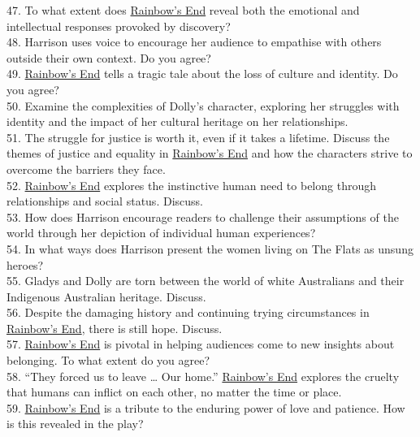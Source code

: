 \documentclass[a4paper]{article}
\begin{document}
47. To what extent does \underline{Rainbow’s End} reveal both the emotional and intellectual responses provoked by discovery?\\

48. Harrison uses voice to encourage her audience to empathise with others outside their own context. Do you agree?\\

49. \underline{Rainbow’s End} tells a tragic tale about the loss of culture and identity. Do you agree?\\

50. Examine the complexities of Dolly’s character, exploring her struggles with identity and the impact of her cultural heritage on her relationships.\\

51. The struggle for justice is worth it, even if it takes a lifetime. Discuss the themes of justice and equality in \underline{Rainbow’s End} and how the characters strive to overcome the barriers they face.\\

52. \underline{Rainbow’s End} explores the instinctive human need to belong through relationships and social status. Discuss.\\

53. How does Harrison encourage readers to challenge their assumptions of the world through her depiction of individual human experiences?\\

54. In what ways does Harrison present the women living on The Flats as unsung heroes?\\

55. Gladys and Dolly are torn between the world of white Australians and their Indigenous Australian heritage. Discuss.\\

56. Despite the damaging history and continuing trying circumstances in \underline{Rainbow’s End}, there is still hope. Discuss.\\

57. \underline{Rainbow’s End} is pivotal in helping audiences come to new insights about belonging. To what extent do you agree?\\

58. “They forced us to leave … Our home.” \underline{Rainbow’s End} explores the cruelty that humans can inflict on each other, no matter the time or place.\\

59. \underline{Rainbow’s End} is a tribute to the enduring power of love and patience. How is this revealed in the play?\\
\end{document}
